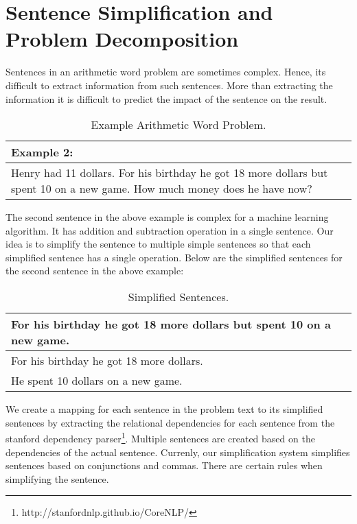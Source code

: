 \documentclass[11pt]{article}
\begin{document}
\section{Sentence Simplification and Problem Decomposition}
Sentences in an arithmetic word problem are sometimes complex. Hence, its difficult to extract information from such sentences. More than extracting the information it is difficult to predict the impact of the sentence on the result. 

\begin{table}[h!]
\centering
\begin{tabular}{ | m{25em} | }
\hline
Example 2:\\
\hline
Henry had 11 dollars. For his birthday he got 18 more dollars but spent 10 on a new game. How much money does he have now?\\
\hline
\end{tabular}
\caption{Example Arithmetic Word Problem.}
\label{table:2}
\end{table}

The second sentence in the above example is complex for a machine learning algorithm. It has addition and subtraction operation in a single sentence. Our idea is to simplify the sentence to multiple simple sentences so that each simplified sentence has a single operation. Below are the simplified sentences for the second sentence in the above example:

\begin{table}[h!]
\centering
\begin{tabular}{ | m{25em} | }
\hline
 \textbf{For his birthday he got 18 more dollars but spent 10 on a new game.}\\
\hline
 For his birthday he got 18 more dollars.\\
\hline
He spent 10 dollars on a new game.\\
\hline
\end{tabular}
\caption{Simplified Sentences.}
\label{table:3}
\end{table}

We create a mapping for each sentence in the problem text to its simplified sentences by extracting the relational dependencies for each sentence from the stanford dependency parser\footnote{http://stanfordnlp.github.io/CoreNLP/ }. Multiple sentences are created based on the dependencies of the actual sentence. Currenly, our simplification system simplifies sentences based on conjunctions and commas. There are certain rules when simplifying the sentence.
\end{document}

